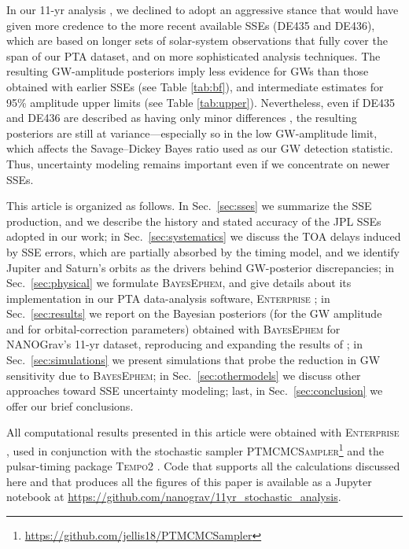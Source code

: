 \documentclass[iop,apj,twocolappendix]{emulateapj}
\begin{document}
In our 11-yr analysis \citep{2018ApJ...859...47A}, we declined to adopt an aggressive stance that would have given more credence to the more recent available SSEs (DE435 and DE436), which are based on longer sets of solar-system observations that fully cover the span of our PTA dataset, and on more sophisticated analysis techniques.
The resulting GW-amplitude posteriors imply less evidence for GWs than those obtained with earlier SSEs (see Table \ref{tab:bf}), and intermediate estimates for 95\% amplitude upper limits (see Table \ref{tab:upper}).
Nevertheless, even if DE435 and DE436 are described as having only minor differences \citep{de435,de436}, the resulting posteriors are still at variance---especially so in the low GW-amplitude limit, which affects the Savage--Dickey Bayes ratio used as our GW detection statistic.
Thus, uncertainty modeling remains important even if we concentrate on newer SSEs.

This article is organized as follows. In Sec.\ \ref{sec:sses} we summarize the SSE production, and we describe the history and stated accuracy of the JPL SSEs adopted in our work; in Sec.\ \ref{sec:systematics} we discuss the TOA delays induced by SSE errors, which are partially absorbed by the timing model, and we identify Jupiter and Saturn's orbits as the drivers behind GW-posterior discrepancies; in Sec.\ \ref{sec:physical} we formulate \textsc{BayesEphem}, and give details about its implementation in our PTA data-analysis software, \textsc{Enterprise} \citep{2019ascl.soft12015E}; in Sec.\ \ref{sec:results} we report on the Bayesian posteriors (for the GW amplitude and for orbital-correction parameters) obtained with \textsc{BayesEphem} for NANOGrav's 11-yr dataset, reproducing and expanding the results of \cite{2018ApJ...859...47A};
in Sec.\ \ref{sec:simulations} we present simulations that probe the reduction in GW sensitivity due to \textsc{BayesEphem};
in Sec.\ \ref{sec:othermodels} we discuss other approaches toward SSE uncertainty modeling;
last, in Sec.\ \ref{sec:conclusion} we offer our brief conclusions.  

All computational results presented in this article were obtained with \textsc{Enterprise}  \citep{2019ascl.soft12015E}, used in conjunction with the stochastic sampler \textsc{PTMCMCSampler}\footnote{\href{https://github.com/jellis18/PTMCMCSampler}{https://github.com/jellis18/PTMCMCSampler}} and the pulsar-timing package \textsc{Tempo2} \citep{2012ascl.soft10015H}.
Code that supports all the calculations discussed here and that produces all the figures of this paper is available as a Jupyter notebook at \url{https://github.com/nanograv/11yr_stochastic_analysis}.
\end{document}
